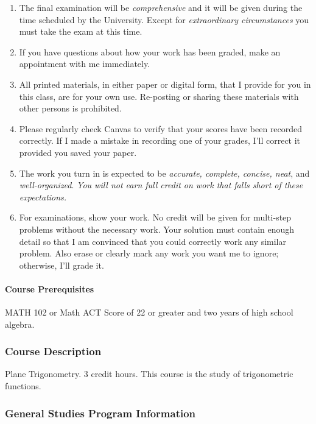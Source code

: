 \documentclass[12pt]{article}
\newcounter{ex}\setcounter{ex}{0}
\begin{document}
\begin{enumerate}
\item The final examination will be \emph{comprehensive} and it will be given during the 
time scheduled by the University. Except for \emph{extraordinary circumstances}
you must take the exam at this time.


 
\item If you have questions about how your work has been graded, make an appointment with me immediately.

\item All printed materials, in either paper or digital form, that I 
provide for you in this class, are for your own use. Re-posting or 
sharing these materials with other persons is prohibited. 

\item Please regularly check Canvas  to verify that your scores have 
been recorded correctly.  If I made a mistake in recording one of
your grades, I'll correct it provided you saved your paper.

\item The work you turn in is expected to be \emph{accurate, 
complete, concise, neat}, and \emph{well-organized}.  
\emph{You will not earn full credit on work that falls short of 
these expectations.}

\item For examinations, show your work.  No credit will be given for multi-step problems without the necessary work. Your solution must contain enough detail
so that I am convinced that you could correctly work any similar problem. Also erase or clearly mark any work you want me to ignore; otherwise,
I'll grade it.  

\end{enumerate}

\paragraph{Course Prerequisites} MATH 102 or Math ACT Score of 22 or greater and two years of high school algebra.

\subsubsection*{Course Description}  Plane Trigonometry.  3 credit hours. This course is the study of trigonometric functions.

\subsubsection*{General Studies Program Information}
\end{document}
